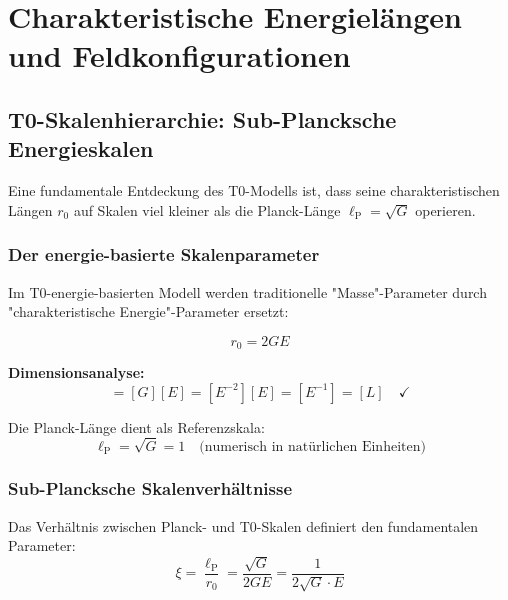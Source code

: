 \documentclass[12pt,a4paper]{report}
\newcommand{\lP}{\ell_{\text{P}}}         %
\newcommand{\rzero}{r_0}                  %
\begin{document}
	\chapter{Charakteristische Energielängen und Feldkonfigurationen}
	\label{chap:energy_lengths_configurations}
	
	\section{T0-Skalenhierarchie: Sub-Plancksche Energieskalen}
	\label{sec:scale_hierarchy}
	
	Eine fundamentale Entdeckung des T0-Modells ist, dass seine charakteristischen Längen $\rzero$ auf Skalen viel kleiner als die Planck-Länge $\lP = \sqrt{G}$ operieren.
	
	\subsection{Der energie-basierte Skalenparameter}
	\label{subsec:energy_based_scale_parameter}
	
	Im T0-energie-basierten Modell werden traditionelle "Masse"-Parameter durch "charakteristische Energie"-Parameter ersetzt:
	
	\begin{equation}
		\boxed{\rzero = 2GE}
		\label{eq:fundamental_r0}
	\end{equation}
	
	\textbf{Dimensionsanalyse:}
	\begin{equation}
		[\rzero] = [G][E] = [E^{-2}][E] = [E^{-1}] = [L] \quad \checkmark
	\end{equation}
	
	Die Planck-Länge dient als Referenzskala:
	\begin{equation}
		\lP = \sqrt{G} = 1 \quad \text{(numerisch in natürlichen Einheiten)}
	\end{equation}
	
	\subsection{Sub-Plancksche Skalenverhältnisse}
	\label{subsec:sub_planckian_ratios}
	
	Das Verhältnis zwischen Planck- und T0-Skalen definiert den fundamentalen Parameter:
	\begin{equation}
		\xi = \frac{\lP}{\rzero} = \frac{\sqrt{G}}{2GE} = \frac{1}{2\sqrt{G} \cdot E}
	\end{equation}
	
\end{document}
